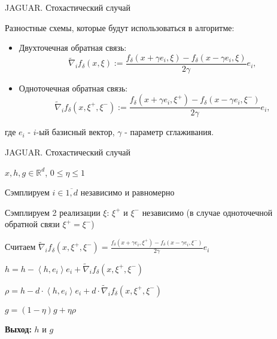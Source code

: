 \documentclass{beamer}
\newcommand{\dotprod}[2]{\left\langle #1,#2 \right\rangle}
\begin{document}
\begin{frame}{JAGUAR. Стохастический случай}

    Разностные схемы, которые будут использоваться в алгоритме:

    \begin{itemize}
        \item Двухточечная обратная связь:
            \begin{equation*}
                \widetilde{\nabla}_if_\delta(x, \xi) :=  \dfrac{f_\delta(x + \gamma e_i, \xi) - f_\delta(x - \gamma e_i, \xi)}{2 \gamma} e_i,
            \end{equation*}
        \item Одноточечная обратная связь:
            \begin{equation*}
                \widetilde{\nabla}_if_\delta(x, \xi^+, \xi^-) :=  \dfrac{f_\delta(x + \gamma e_i, \xi^+) - f_\delta(x - \gamma e_i, \xi^-)}{2 \gamma} e_i,
            \end{equation*}
    \end{itemize}

    где $e_i$ - $i$-ый базисный вектор, $\gamma$ - параметр сглаживания.

\end{frame}


\begin{frame}{JAGUAR. Стохастический случай}

    \begin{algorithm}[H]
    	\caption{JAGUAR. Стохастический случай}
        \begin{algorithmic}[1]
    		 $x, h, g \in \mathbb{R}^d$, $0 \leq \eta \leq 1$
      
            \State Сэмплируем $i \in \overline{1, d}$ независимо и равномерно
          
            \State Сэмплируем 2 реализации $\xi$: $\xi^+$ и $\xi^-$ независимо (в случае одноточечной обратной связи $\xi^+= \xi^-$)

            \State Считаем $\widetilde{\nabla}_i f_{\delta}(x, \xi^+, \xi^-) = \frac{f_{\delta}(x + \gamma e_i, \xi^+) - f_{\delta}(x - \gamma e_i, \xi^-)}{2 \gamma} e_i$

            \State $h = h - \dotprod{h}{e_i} e_i + \widetilde{\nabla}_i f_{\delta}(x, \xi^+, \xi^-)$

            \State $\rho = h - d \cdot \dotprod{h}{e_i} e_i + d \cdot \widetilde{\nabla}_i f_{\delta}(x, \xi^+, \xi^-)$

            \State $g = (1 - \eta) g + \eta \rho$
    
            \State \textbf{Выход:} $h$ и $g$ 
        \end{algorithmic}
    \end{algorithm}
  
\end{frame}
\end{document}
